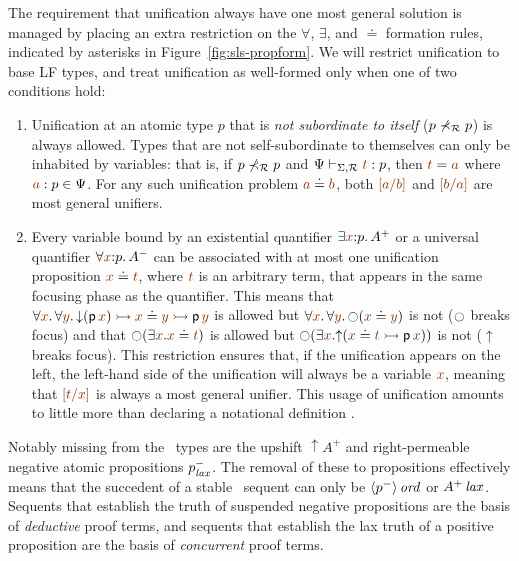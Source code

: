 The requirement that unification always have one most general solution
is managed by placing an extra restriction on the $\forall$, 
$\exists$, and $\doteq$ formation rules, indicated by asterisks in
Figure~\ref{fig:sls-propform}. We will restrict unification to 
base LF types, and treat unification as well-formed only when one 
of two conditions hold:
\smallskip
\begin{enumerate}
\item Unification at an atomic type $p$ that is {\it not
subordinate to itself} ($p \not\prec_\mathcal R p$) is always allowed. 
Types that are not self-subordinate to themselves can only be inhabited
by variables: that is, if $p \not\prec_\mathcal R p$ and 
$\Psi \vdash_{\Sigma,\subord} \lf{t} : p$, then $\lf{t} = \lf{{a}}$
where $\lf{a}:p \in \Psi$. For any such unification problem 
$\lf{{a}} \doteq \lf{{b}}$, both 
$\lf{[{a}/b]}$ and $\lf{[{b}/a]}$ are most
general unifiers.
\item Every variable bound by an existential quantifier 
$\exists \lf{x}{:}p.\,A^+$ or a universal quantifier 
$\forall \lf{x}{:}p.\,A^-$ can be associated with at most one 
unification proposition $\lf{x} \doteq \lf{t}$, where $\lf{t}$ is an arbitrary 
term, that appears in the same focusing
phase as the quantifier. This means that 
$\forall \lf{x}.\, 
 \forall \lf{y}.\, {\downarrow}({\sf p}\,\lf{x}) 
   \lefti \lf{x} \doteq \lf{y} 
   \lefti {\sf p}\,\lf{y}$ is allowed but
$\forall \lf{x}.\,\forall \lf{y}.\,{\ocircle}(\lf{x} \doteq \lf{y})$ is not 
($\ocircle$ breaks focus) and that 
${\ocircle}(\exists \lf{x}. \lf{x} \doteq \lf{t})$ is allowed but
${\ocircle}(\exists \lf{x}. 
  {\uparrow}(\lf{x} \doteq \lf{t} \lefti {\sf p}\,\lf{x}))$
is not (${\uparrow}$ breaks focus). This restriction ensures that, if
the unification appears on the left, the left-hand side of the unification
will always be a variable
$\lf{x}$, meaning that $\lf{[t/x]}$ is always a most general unifier.
This usage of unification amounts to little more than declaring a notational
definition \cite{pfenning99algorithms}.
\end{enumerate}
\smallskip

Notably missing from the \sls~types are the upshift ${\uparrow}A^+$
and right-permeable negative atomic propositions $p^-_{\it lax}$. The
removal of these to propositions effectively means that the succedent
of a stable \sls~sequent can only be ${\langle {p^-} \rangle}\,{{\it ord}}$ or
${A^+}\,{{\it lax}}$. Sequents that establish the truth of suspended negative
propositions are the basis of {\it deductive} proof terms, and
sequents that establish the lax truth of a positive proposition are
the basis of {\it concurrent} proof terms. 

